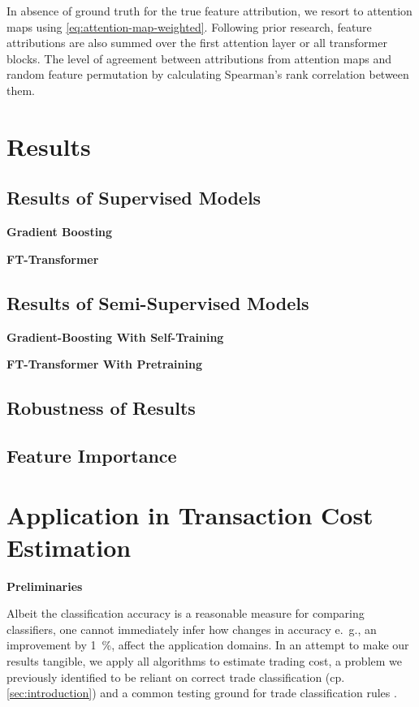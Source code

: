 In absence of ground truth for the true feature attribution, we resort to attention maps using \cref{eq:attention-map-weighted}. Following prior research, feature attributions are also summed over the first attention layer or all transformer blocks. The level of agreement between attributions from attention maps and random feature permutation by calculating Spearman's rank correlation between them.

\newpage
\section{Results}\label{sec:results}


\subsection{Results of Supervised
    Models}\label{sec:results-of-supervised-models}

\textbf{Gradient Boosting}

\textbf{FT-Transformer}

\subsection{Results of Semi-Supervised
    Models}\label{sec:results-of-semi-supervised-models}


\textbf{Gradient-Boosting With Self-Training}

\textbf{FT-Transformer With Pretraining}

\subsection{Robustness of Results}\label{sec:robustness-checks}

\subsection{Feature Importance}\label{sec:feature-importance}

\newpage
\section{Application in Transaction Cost Estimation}\label{sec:application}

\textbf{Preliminaries}


Albeit the classification accuracy is a reasonable measure for comparing classifiers, one cannot immediately infer how changes in accuracy e.~g., an improvement by \SI{1}{\percent}, affect the application domains. In an attempt to make our results tangible, we apply all algorithms to estimate trading cost, a problem we previously identified to be reliant on correct trade classification (cp. \cref{sec:introduction}) and a common testing ground for trade classification rules \autocites[cp.][541]{ellisAccuracyTradeClassification2000}[][569]{finucaneDirectTestMethods2000}[][271--278]{petersonEvaluationBiasesExecution2003}[][896--897]{savickasInferringDirectionOption2003}.


